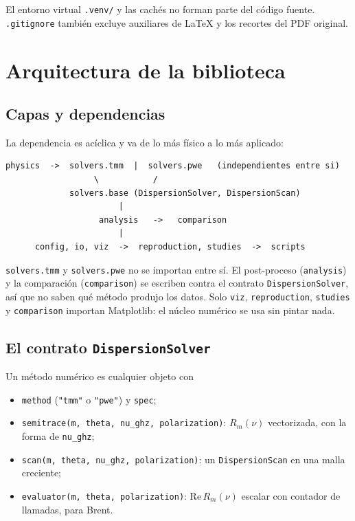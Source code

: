 \documentclass[11pt,a4paper]{article}
\begin{document}
El entorno virtual \texttt{.venv/} y las cachés no forman parte del código
fuente. \texttt{.gitignore} también excluye auxiliares de LaTeX y los recortes
del PDF original.

\section{Arquitectura de la biblioteca}

\subsection{Capas y dependencias}

La dependencia es acíclica y va de lo más físico a lo más aplicado:

\begin{lstlisting}
physics  ->  solvers.tmm  |  solvers.pwe   (independientes entre si)
                  \           /
             solvers.base (DispersionSolver, DispersionScan)
                       |
                   analysis   ->   comparison
                       |
      config, io, viz  ->  reproduction, studies  ->  scripts
\end{lstlisting}

\texttt{solvers.tmm} y \texttt{solvers.pwe} no se importan entre sí. El
post-proceso (\texttt{analysis}) y la comparación (\texttt{comparison}) se
escriben contra el contrato \texttt{DispersionSolver}, así que no saben qué
método produjo los datos. Solo \texttt{viz}, \texttt{reproduction},
\texttt{studies} y \texttt{comparison} importan Matplotlib: el núcleo numérico
se usa sin pintar nada.

\subsection{El contrato \texttt{DispersionSolver}}

Un método numérico es cualquier objeto con

\begin{itemize}
\item \texttt{method} (\texttt{"tmm"} o \texttt{"pwe"}) y \texttt{spec};
\item \texttt{semitrace(m, theta, nu\_ghz, polarization)}: \(R_m(\nu)\)
vectorizada, con la forma de \texttt{nu\_ghz};
\item \texttt{scan(m, theta, nu\_ghz, polarization)}: un
\texttt{DispersionScan} en una malla creciente;
\item \texttt{evaluator(m, theta, polarization)}: \(\mathrm{Re}\,R_m(\nu)\)
escalar con contador de llamadas, para Brent.
\end{itemize}
\end{document}
